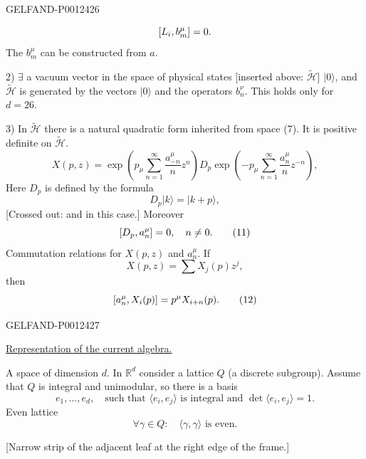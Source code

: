 \begin{GelfandAdjacentEvidence}{GELFAND-P001242}{6}

\begin{equation*}
\relax [L_i,b_m^\mu]=0.
\end{equation*}
The $b_m^\mu$ can be constructed from $a$.

2) $\exists$ a vacuum vector in the space of physical states [inserted above: $\widetilde{\mathcal H}$] $|0\rangle$,
and $\widetilde{\mathcal H}$ is generated by the vectors $|0\rangle$ and the operators $b_n^\nu$.
This holds only for \underline{\underline{$d=26$}}.

3) In $\widetilde{\mathcal H}$ there is a natural quadratic form inherited from space (7). It is positive definite on $\widetilde{\mathcal H}$.
\begin{equation*}
X(p,z)=\exp\left(p_\mu\sum_{n=1}^{\infty}\frac{a_{-n}^\mu}{n}z^n\right)
D_p\exp\left(-p_\mu\sum_{n=1}^{\infty}\frac{a_n^\mu}{n}z^{-n}\right),\tag{9}
\end{equation*}
Here $D_p$ is defined by the formula
\begin{equation*}
D_p|k\rangle=|k+p\rangle,\tag{10}
\end{equation*}
[Crossed out: and in this case.] Moreover
\begin{equation*}
\relax [D_p,a_n^\mu]=0,\quad n\ne0.\tag{11}
\end{equation*}
Commutation relations for $X(p,z)$ and $a_n^\mu$. If
\begin{equation*}
X(p,z)=\sum X_j(p)z^j,
\end{equation*}
then
\begin{equation*}
\relax [a_n^\mu,X_i(p)]=p^\mu X_{i+n}(p).\tag{12}
\end{equation*}
\end{GelfandAdjacentEvidence}
\begin{GelfandAdjacentEvidence}{GELFAND-P001242}{7}


\underline{Representation of the current algebra.}

A space of dimension $d$. In $\mathbb R^d$ consider a lattice $Q$ (a discrete subgroup). Assume that $Q$ is integral and unimodular, so there is a basis
\begin{equation*}
e_1,\ldots,e_d,\quad\text{such that }\langle e_i,e_j\rangle\text{ is integral and }\det\langle e_i,e_j\rangle=1.\tag{13}
\end{equation*}
Even lattice
\begin{equation*}
\forall\gamma\in Q:\quad\langle\gamma,\gamma\rangle\text{ is even}.\tag{14}
\end{equation*}

[Narrow strip of the adjacent leaf at the right edge of the frame.]
\end{GelfandAdjacentEvidence}



